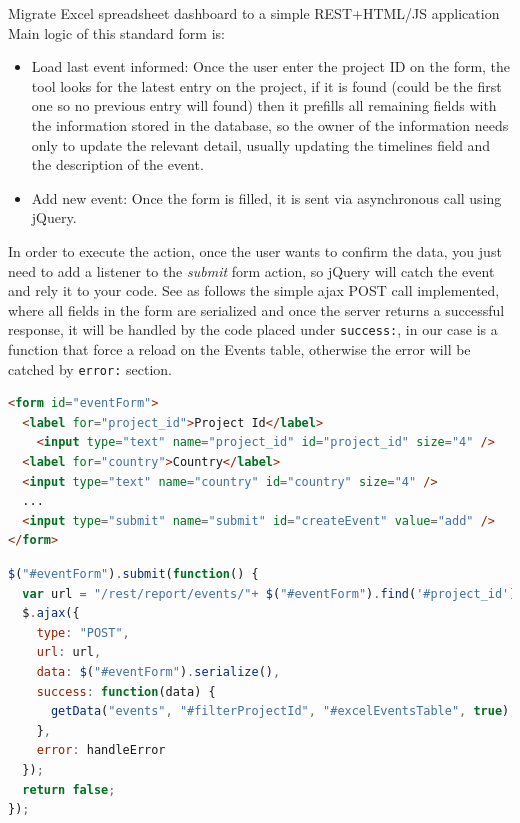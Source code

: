 \begin{part}{Migrate Excel spreadsheet dashboard to a simple REST+HTML/JS
application}
Main logic of this standard form is:
\begin{itemize}
  \item Load last event informed: Once the user enter the project ID on the
  form, the tool looks for the latest entry on the project, if it is found
  (could be the first one so no previous entry will found) then it prefills all
  remaining fields with the information stored in the database, so the owner of
  the information needs only to update  the relevant detail, usually updating
  the timelines field and the description of the event.
  \item Add new event: Once the form is filled, it is sent via asynchronous call
  using jQuery.
\end{itemize}

In order to execute the action, once the user wants to confirm the data, you
just need to add a listener to the \emph{submit} form action, so jQuery will
catch the event and rely it to your code. See as follows the simple ajax POST
call implemented, where all fields in the form are serialized and once the
server returns a successful response, it will be handled by the code placed
under \texttt{success:}, in our case is a function that force a reload on the Events
table, otherwise the error will be catched by \texttt{error:} section.
\\

\begin{lstlisting}[language=HTML,breaklines=true,caption=Add\ new\ Event\
HTML\ code,label=f_migration_addnewevent_html]
<form id="eventForm">
  <label for="project_id">Project Id</label>
    <input type="text" name="project_id" id="project_id" size="4" />
  <label for="country">Country</label>
  <input type="text" name="country" id="country" size="4" /> 
  ...
  <input type="submit" name="submit" id="createEvent" value="add" />
</form>
\end{lstlisting}

\begin{lstlisting}[language=Javascript,breaklines=true,caption=Add\ new\ Event\
jQuery\ code,label=f_migration_addnewevent_jquery] 
$("#eventForm").submit(function() { 
  var url = "/rest/report/events/"+ $("#eventForm").find('#project_id').val();
  $.ajax({ 
    type: "POST", 
    url: url, 
    data: $("#eventForm").serialize(),
    success: function(data) {
      getData("events", "#filterProjectId", "#excelEventsTable", true);
    },
    error: handleError
  });
  return false;
});
\end{lstlisting}


\end{part}
